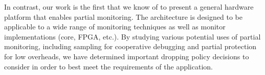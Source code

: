 In contrast, our work is the first that we know of to present a general hardware platform that enables
partial monitoring. The architecture is designed to be applicable to a wide range of monitoring
techniques as well as monitor implementations (core, FPGA, etc.). By studying various potential
uses of partial monitoring, including sampling for cooperative debugging and
partial protection for low overheads, we have determined important dropping
policy decisions to consider in order to best meet the requirements of the
application.


